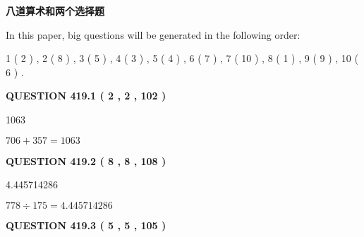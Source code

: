 \documentclass{ctexart}
\begin{document}
   
   
   
   
   
 \vspace{0.2in}
{\LARGE {\textbf{ 八道算术和两个选择题}}}
   
   
   
\vspace{0.2in}
   
In this paper, big questions will be generated in the following order: 
   
   
   1 ( 2 )
 ,
   2 ( 8 )
 ,
   3 ( 5 )
 ,
   4 ( 3 )
 ,
   5 ( 4 )
 ,
   6 ( 7 )
 ,
   7 ( 10 )
 ,
   8 ( 1 )
 ,
   9 ( 9 )
 ,
   10 ( 6 )
 .
  
\vspace{0.2in}
  
{\textbf{\Large{QUESTION
419.1 
 ( 2 , 2 , 102 )
}}}
  
  
 
 
\noindent{}

1063
 
 
 
 
\noindent{}

$ %
706 +  %
357=   %
1063$
 
 
  
\vspace{0.2in}
  
{\textbf{\Large{QUESTION
419.2 
 ( 8 , 8 , 108 )
}}}
  
  
 
 
\noindent{}

4.445714286
 
 
 
 
\noindent{}

$ %
778 \div  %
175=   %
4.445714286$
 
 
  
\vspace{0.2in}
  
{\textbf{\Large{QUESTION
419.3 
 ( 5 , 5 , 105 )
}}}
  
  
 
 
\noindent{}
\end{document}
